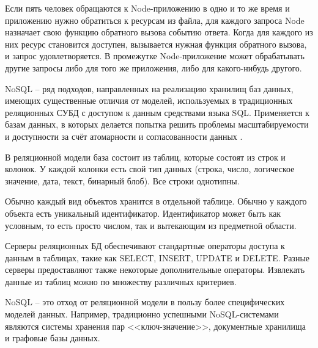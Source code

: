 Если пять человек обращаются к Node-приложению в одно и то же время и приложению нужно обратиться к ресурсам из файла, для каждого запроса Node назначает свою функцию обратного вызова событию ответа. Когда для каждого из них ресурс становится доступен, вызывается нужная функция обратного вызова, и запрос удовлетворяется. В промежутке Node-приложение может обрабатывать другие запросы либо для того же приложения, либо для какого-нибудь  другого.

NoSQL -- ряд подходов, направленных на реализацию хранилищ баз данных, имеющих существенные отличия от моделей, используемых в традиционных реляционных СУБД с доступом к данным средствами языка SQL. Применяется к базам данных, в которых делается попытка решить проблемы масштабируемости и доступности за счёт атомарности и согласованности данных \cite{nosql}.

В реляционной модели база состоит из таблиц, которые состоят из строк и колонок. У каждой колонки есть свой тип данных (строка, число, логическое значение, дата, текст, бинарный блоб). Все строки однотипны.

Обычно каждый вид объектов хранится в отдельной таблице. Обычно у каждого объекта есть уникальный идентификатор. Идентификатор может быть как условным, то есть просто числом, так и вытекающим из предметной области.

Серверы реляционных БД обеспечивают стандартные операторы доступа к данным в таблицах, такие как SELECT, INSERT, UPDATE и DELETE. Разные серверы предоставляют также некоторые дополнительные операторы. Извлекать данные из таблиц можно по множеству различных критериев.

NoSQL -- это отход от реляционной модели в пользу более специфических моделей данных. Например, традиционно успешными NoSQL-системами являются системы хранения пар <<ключ-значение>>, документные хранилища и графовые базы данных.

